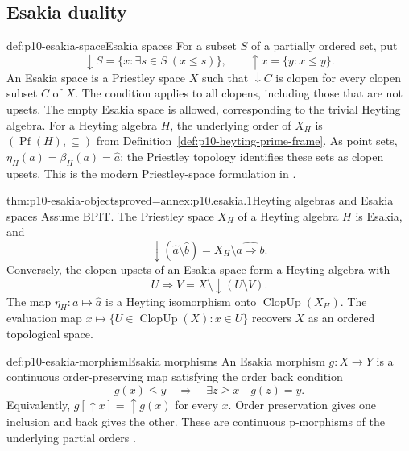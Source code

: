 
\subsection{Esakia duality}
\label{sec:p10-esakia-duality}

\begin{hbdefinition}{def:p10-esakia-space}{Esakia spaces}
For a subset \(S\) of a partially ordered set, put
\[
 \downarrow S=\{x:\exists s\in S\ (x\leq s)\},\qquad
 \uparrow x=\{y:x\leq y\}.
\]
An Esakia space is a Priestley space \(X\) such that
\(\downarrow C\) is clopen for every clopen subset \(C\) of \(X\).
The condition applies to all clopens, including those that are
not upsets.
The empty Esakia space is allowed, corresponding to the trivial
Heyting algebra.
For a Heyting algebra \(H\), the underlying order of \(X_H\) is
\((\operatorname{Pf}(H),\subseteq)\) from
Definition~\ref{def:p10-heyting-prime-frame}.
As point sets, \(\eta_H(a)=\beta_H(a)=\widehat a\); the Priestley
topology identifies these sets as clopen upsets.
This is the modern Priestley-space formulation in
\cite[Definition~2.3.20, p.~34]{Bezhanishvili2006Thesis}.
\end{hbdefinition}

\begin{hbtheorem}{thm:p10-esakia-objects}{proved=annex:p10.esakia.1}{Heyting algebras and Esakia spaces}
Assume BPIT.
The Priestley space \(X_H\) of a Heyting algebra \(H\) is Esakia,
and
\[
 \downarrow(\widehat a\setminus\widehat b)
       =X_H\setminus\widehat{a\Rightarrow b}.
\]
Conversely, the clopen upsets of an Esakia space form a Heyting
algebra with
\[
 U\Rightarrow V=X\setminus\downarrow(U\setminus V).
\]
The map \(\eta_H:a\mapsto\widehat a\) is a Heyting isomorphism
onto \(\operatorname{ClopUp}(X_H)\).
The evaluation map
\(x\mapsto\{U\in\operatorname{ClopUp}(X):x\in U\}\)
recovers \(X\) as an ordered topological space.
\end{hbtheorem}

\begin{hbdefinition}{def:p10-esakia-morphism}{Esakia morphisms}
An Esakia morphism \(g:X\to Y\) is a continuous order-preserving
map satisfying the order back condition
\[
 g(x)\leq y\quad\Longrightarrow\quad
       \exists z\geq x\quad g(z)=y.
\]
Equivalently, \(g[\uparrow x]=\uparrow g(x)\) for every \(x\).
Order preservation gives one inclusion and back gives the other.
These are continuous p-morphisms of the underlying partial orders
\cite[\S2.3.3, pp.~35--37]{Bezhanishvili2006Thesis}.
\end{hbdefinition}


